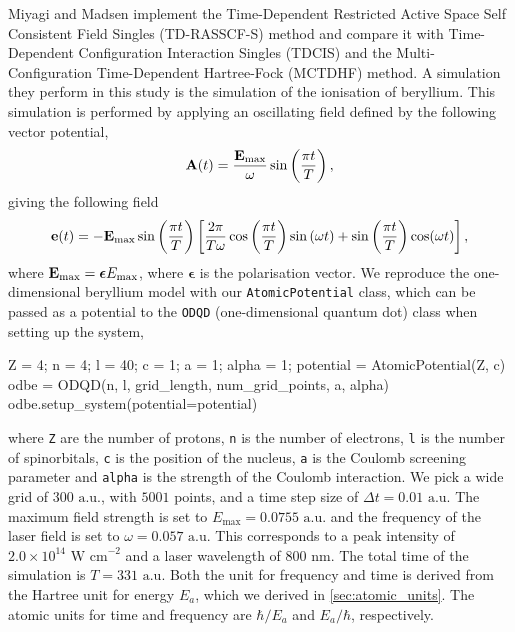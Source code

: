 Miyagi and Madsen \cite{miyagi2013time} implement the Time-Dependent 
Restricted Active Space Self Consistent Field Singles (TD-RASSCF-S) method 
and compare it with Time-Dependent Configuration Interaction Singles (TDCIS) and 
the Multi-Configuration Time-Dependent Hartree-Fock (MCTDHF) method. A simulation they 
perform in this study is the simulation of the ionisation of beryllium. This 
simulation is performed by applying an oscillating field defined by the following 
vector potential,
\begin{equation}
    \vb{A}(t) = \frac{\vb{E}_\text{max}}{\omega}\sin\left(\frac{\pi t}{T} \right),
\end{equation}
giving the following field
\begin{equation}
    \vb{e}(t) = - \vb{E}_\text{max}\sin\left(\frac{\pi t}{T} \right)
    \left[
        \frac{2\pi}{T\omega} \cos\left(\frac{\pi t}{T} \right) \sin\left(\omega t \right)
        + \sin\left(\frac{\pi t}{T} \right) \cos(\omega t)
    \right],
\end{equation}
where $\vb{E}_\text{max} = \boldsymbol{\epsilon}E_\text{max}$, where
$\boldsymbol{\epsilon}$ is the polarisation vector.
We reproduce the one-dimensional beryllium model with our \lstinline{AtomicPotential}
class, which can be passed as a potential to the \lstinline{ODQD}
(one-dimensional quantum dot) class when setting up the system,
\begin{python}
Z = 4; n = 4; l = 40; c = 1; a = 1; alpha = 1;
potential = AtomicPotential(Z, c)
odbe = ODQD(n, l, grid_length, num_grid_points, a, alpha)
odbe.setup_system(potential=potential)
\end{python}
where \lstinline{Z} are the number of protons, \lstinline{n} is the number of electrons,
\lstinline{l} is the number of spinorbitals, \lstinline{c} is the position of the nucleus,
\lstinline{a} is the Coulomb screening parameter and \lstinline{alpha} is the strength of the 
Coulomb interaction. We pick a wide grid of $300 \text{ a.u.}$, with $5001$ points, and 
a time step size of $\Delta t=0.01 \text{ a.u.}$ The maximum field strength is set to
$E_\text{max} = 0.0755 \text{ a.u.}$ and the frequency of the laser field is set to
$\omega = 0.057 \text{ a.u.}$ This corresponds to a peak intensity of 
$2.0 \times 10^{14} \text{ W cm}^{-2}$ and a laser wavelength of $800 \text{ nm}$.
The total time of the simulation is $T=331 \text{ a.u.}$ Both the unit for frequency and 
time is derived from the Hartree unit for energy $E_a$, which we derived in
\autoref{sec:atomic_units}. The atomic units for time and frequency are $\hbar/E_a$ and
$E_a/\hbar$, respectively.

